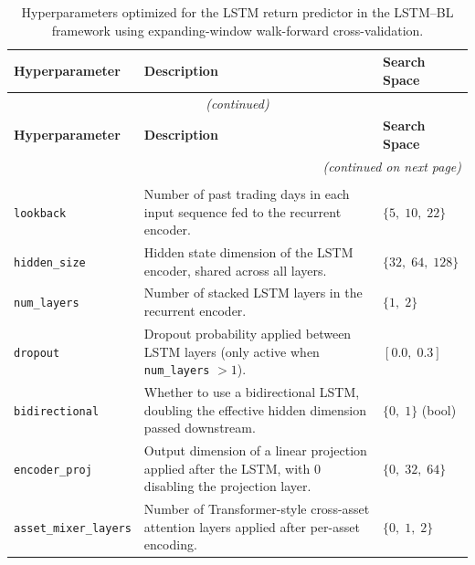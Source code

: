 \begin{longtable}{@{}p{3.7cm} p{7.5cm} p{3.3cm}@{}}
\caption{Hyperparameters optimized for the LSTM return predictor in the LSTM--BL framework using expanding-window walk-forward cross-validation.}
\label{tab:hp_lstm_bl_lstm} \\
\toprule
\textbf{Hyperparameter} & \textbf{Description} & \textbf{Search Space} \\
\midrule
\endfirsthead

\multicolumn{3}{c}{\footnotesize\textit{(continued)}} \\
\toprule
\textbf{Hyperparameter} & \textbf{Description} & \textbf{Search Space} \\
\midrule
\endhead

\bottomrule
\multicolumn{3}{r}{\footnotesize\textit{(continued on next page)}} \\
\endfoot

\bottomrule
\endlastfoot
 
\multicolumn{3}{@{}l}{\small\textit{--- Architecture Hyperparameters ---}} \\[2pt]
 
\texttt{lookback} & Number of past trading days in each input sequence fed to the recurrent encoder. & $\{5,\;10,\;22\}$ \\[4pt]
 
\texttt{hidden\_size} & Hidden state dimension of the LSTM encoder, shared across all layers. & $\{32,\;64,\;128\}$ \\[4pt]
 
\texttt{num\_layers} & Number of stacked LSTM layers in the recurrent encoder. & $\{1,\;2\}$ \\[4pt]
 
\texttt{dropout} & Dropout probability applied between LSTM layers (only active when \texttt{num\_layers} $> 1$). & $[0.0,\;0.3]$ \\[4pt]
 
\texttt{bidirectional} & Whether to use a bidirectional LSTM, doubling the effective hidden dimension passed downstream. & $\{0,\;1\}$ (bool) \\[4pt]
 
\texttt{encoder\_proj} & Output dimension of a linear projection applied after the LSTM, with 0 disabling the projection layer. & $\{0,\;32,\;64\}$ \\[4pt]
 
\texttt{asset\_mixer\_layers} & Number of Transformer-style cross-asset attention layers applied after per-asset encoding. & $\{0,\;1,\;2\}$ \\[4pt]
 

\end{longtable}

